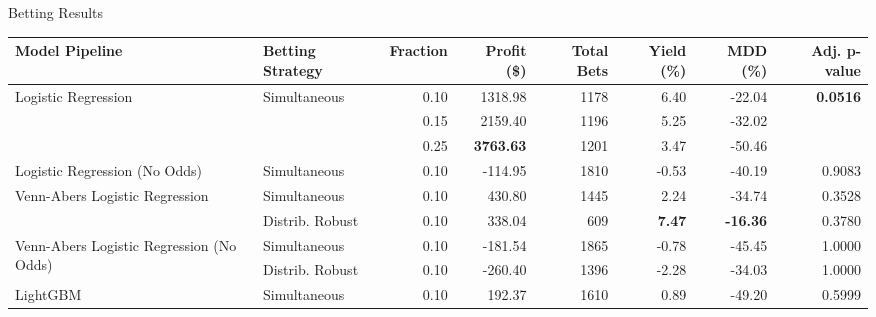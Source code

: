 \documentclass[aspectratio=169,xcolor=dvipsnames]{beamer}
\begin{document}

\begin{frame}{Betting Results}
    \tiny
    \begin{table}[]
    \begin{tabular}{@{}llrrrrrr@{}}
    \toprule
    Model Pipeline                                            & Betting Strategy                    & Fraction & Profit (\$) & Total Bets & Yield (\%) & MDD (\%) & Adj. p-value        \\ \midrule
    \multirow{3}{*}{Logistic Regression}                      & \multirow{3}{*}{Simultaneous} & 0.10     & 1318.98     & 1178       & 6.40       & -22.04            & \multirow{3}{*}{\textbf{0.0516}} \\
                                                              &                                     & 0.15     & 2159.40     & 1196       & 5.25       & -32.02            &                           \\
                                                              &                                     & 0.25     & \textbf{3763.63}     & 1201       & 3.47       & -50.46            &                           \\
    Logistic Regression (No Odds)                             & Simultaneous                  & 0.10     & -114.95       & 1810       & -0.53       & -40.19            & 0.9083                  \\
    \multirow{2}{*}{Venn-Abers Logistic Regression}           & Simultaneous                  & 0.10     & 430.80      & 1445       & 2.24       & -34.74            & 0.3528                  \\
                                                              & Distrib. Robust        & 0.10     & 338.04      & 609        & \textbf{7.47}       & \textbf{-16.36}            & 0.3780                  \\
    \multirow{2}{*}{Venn-Abers Logistic Regression (No Odds)} & Simultaneous                 & 0.10     & -181.54      & 1865       & -0.78      & -45.45            & 1.0000                  \\
                                                              & Distrib. Robust         & 0.10     & -260.40     & 1396       & -2.28      & -34.03            & 1.0000                  \\
    LightGBM                                                  & Simultaneous                 & 0.10     & 192.37      & 1610       & 0.89       & -49.20            & 0.5999                  \\

\end{tabular}
\end{table}
\end{frame}
\end{document}
